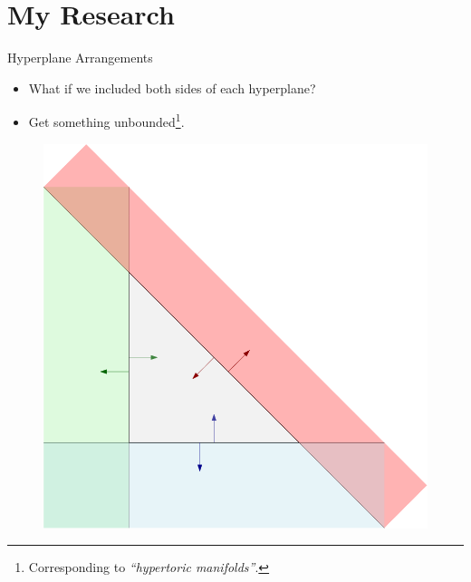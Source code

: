 \section{My Research}

\begin{frame}{Hyperplane Arrangements}

    \begin{itemize}
       \item What if we included both sides of each hyperplane?
       \item Get something unbounded\footnote{Corresponding to \emph{``hypertoric manifolds''}.}.
    \end{itemize}

    \begin{figure}
        \includegraphics[scale=0.2]{resources/hyperplanes.png}
    \end{figure}

\end{frame}

